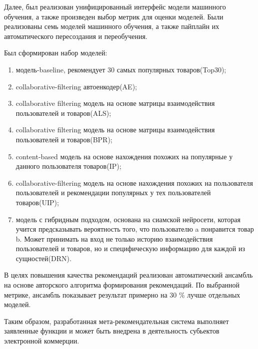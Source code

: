 \documentclass[14pt]{mmcs_article}
\newenvironment{myenumerate}
{ \begin{enumerate}
		\setlength{\itemsep}{0pt}
		\setlength{\parskip}{0pt}
		\setlength{\parsep}{0pt}     }
	{ \end{enumerate}                  }
\begin{document}
Далее, был реализован унифицированный интерфейс модели машинного обучения, а также произведен выбор метрик для оценки моделей. Были реализованы семь моделей машинного обучения, а также пайплайн их автоматического пересоздания и переобучения.

Был сформирован набор моделей:
\begin{myenumerate}
	\item модель-baseline, рекомендует 30 самых популярных товаров(Top30);
	\item collaborative-filtering автоенкодер(AE);
	\item collaborative filtering модель на основе матрицы взаимодействия пользователей и товаров(ALS);
	\item collaborative filtering модель на основе матрицы взаимодействия пользователей и товаров(BPR);
	\item content-based модель на основе нахождения похожих на популярные у данного пользователя товаров(IP);
	\item collaborative-filtering модель на основе нахождения похожих на пользователя пользователей и рекомендации популярных у тех пользователей товаров(UIP);
	\item модель с гибридным подходом, основана на сиамской нейросети, которая учится предсказывать вероятность того, что пользователю a понравится товар b. Может принимать на вход не только историю взаимодействия пользователей и товаров, но и специфическую информацию для каждой из сущностей(DRN).
\end{myenumerate}



В целях повышения качества рекомендаций реализован автоматический ансамбль на основе авторского алгоритма формирования рекомендаций. По выбранной метрике, ансамбль показывает результат примерно на 30 \% лучше отдельных моделей.

Таким образом, разработанная мета-рекомендательная система выполняет заявленные функции и может быть внедрена в деятельность субьектов электронной коммерции.

\newpage

\renewcommand{\refname}{\centering \textbf{Литература}}

\end{document}
